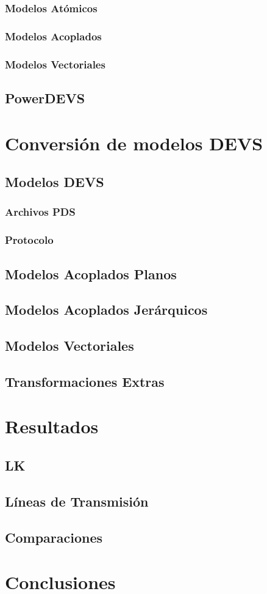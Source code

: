 \documentclass{beamer}
\begin{document}
		\subsubsection{Modelos Atómicos}
		\subsubsection{Modelos Acoplados}
		\subsubsection{Modelos Vectoriales}
	\subsection{PowerDEVS}
\section{Conversión de modelos DEVS}
	\subsection{Modelos DEVS}
		\subsubsection{Archivos PDS}
		\subsubsection{Protocolo}
	\subsection{Modelos Acoplados Planos}
	\subsection{Modelos Acoplados Jerárquicos }
	\subsection{Modelos Vectoriales}
	\subsection{Transformaciones Extras}
\section{Resultados}
	\subsection{LK}
	\subsection{Líneas de Transmisión}
	\subsection{Comparaciones}
\section{Conclusiones}
\end{document}
